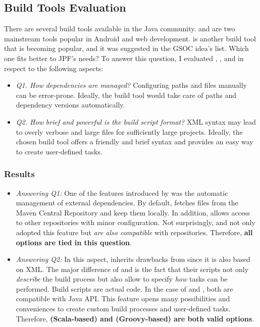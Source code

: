 \documentclass{article}
\begin{document}
\subsection{Build Tools Evaluation}
\label{sec:eval}

There are several build tools available in the Java community.
\maven{} and \gradle{} are two mainstream tools popular in Android and web
development.
\sbt{}\cite{page:sbt} is another build tool that is becoming popular, and it
was suggested in the GSOC idea's list\cite{page:jpf-gsoc18}.
Which one fits better to JPF's needs?
To answer this question, I evaluated \maven{}, \gradle{}, and \sbt{} in respect
to the following aspects:

\begin{itemize}
\item \emph{Q1. How dependencies are managed?} Configuring paths and \jar{}
files manually can be error-prone. Ideally, the build tool would take care of
paths and dependency versions automatically.
\item \emph{Q2. How brief and powerful is the build script format?} XML syntax
may lead to overly verbose and large files for sufficiently large projects.
Ideally, the chosen build tool offers a friendly and brief syntax and provides
an easy way to create user-defined tasks.

\end{itemize}

\subsubsection*{Results}
\label{sec:results}

\begin{itemize}
\item \emph{Answering Q1:}
One of the features introduced by \maven{} was the automatic management of
external dependencies.
By default, \maven{} fetches \jar{} files from the Maven Central
Repository\cite{page:mvncentral} and keep them locally.
In addition, \maven{} allows access to other repositories\cite{page:mvnrepo}
with minor configuration.
Not surprisingly, \gradle{} and \sbt{} not only adopted this feature but
\emph{are also compatible} with \maven{} repositories.
Therefore, \textbf{all options are tied in this question}.

\item \emph{Answering Q2:}
In this aspect, \maven{} inherits drawbacks from \ant{} since it is also based
on XML.
The major difference of \gradle{} and \sbt{} is the fact that their scripts not
only \emph{describe} the build process but also allow to specify \emph{how}
tasks can be performed.
Build scripts are actual code.
In the case of \sbt{} and \gradle{}, both are compatible with Java API.
This feature opens many possibilities and conveniences to create custom build
processes and user-defined tasks.
Therefore, \textbf{\sbt{} (Scala-based) and \gradle{} (Groovy-based) are both
valid options}.

\end{itemize}
\end{document}
